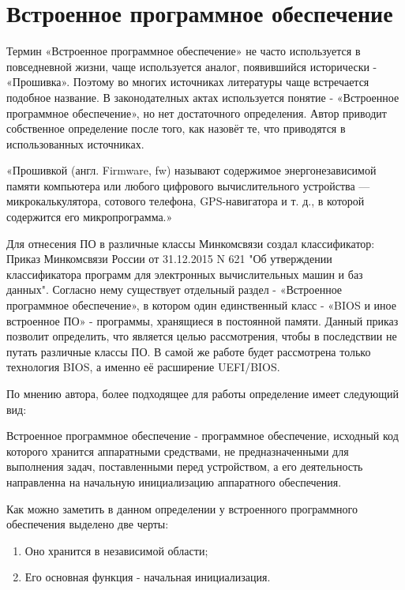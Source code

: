 \section{Встроенное программное обеспечение}
Термин «Встроенное программное обеспечение» не часто используется в повседневной жизни,
	чаще используется аналог,
		появившийся исторически - «Прошивка».
Поэтому во многих источниках литературы чаще встречается подобное название.
В законодателных актах используется понятие - «Встроенное программное обеспечение»,
	но нет достаточного определения.
Автор приводит собственное определение после того,
	как назовёт те,
		что приводятся в использованных источниках.

«Прошивкой (англ. Firmware, fw) называют содержимое энергонезависимой памяти компьютера или любого цифрового вычислительного устройства — микрокалькулятора, сотового телефона, GPS-навигатора и т. д., в которой содержится его микропрограмма.» \cite{wiki:firmware}

Для отнесения ПО в различные классы Минкомсвязи создал классификатор:
Приказ Минкомсвязи России от 31.12.2015 N 621
"Об утверждении классификатора программ
для электронных вычислительных машин и
баз данных".\cite{minkomsvyaz:klassificator}
Согласно нему существует отдельный раздел - «Встроенное программное обеспечение»,
	в котором один единственный класс - «BIOS и иное встроенное ПО» - 
		программы, хранящиеся в постоянной памяти.\cite{minkomsvyaz:klassificator}
Данный приказ позволит определить, 
	что является целью рассмотрения,
	чтобы в последствии не путать различные классы ПО.
В самой же работе будет рассмотрена только технология BIOS,
	а именно её расширение UEFI/BIOS.

По мнению автора, более подходящее для работы определение имеет следующий вид:

Встроенное программное обеспечение -
	программное обеспечение, исходный код которого хранится аппаратными средствами, не предназначенными для выполнения задач, поставленными перед устройством,
	а его деятельность направленна на начальную инициализацию аппаратного обеспечения.

Как можно заметить в данном определении у встроенного программного обеспечения выделено две черты:

\begin{enumerate}
	\item Оно хранится в независимой области;
	\item Его основная функция - начальная инициализация.
\end{enumerate}



